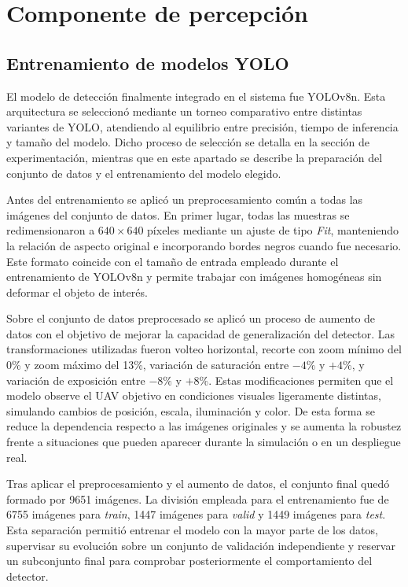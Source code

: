 \section{Componente de percepción}

\subsection{Entrenamiento de modelos YOLO}

El modelo de detección finalmente integrado en el sistema fue YOLOv8n. Esta arquitectura se seleccionó mediante un torneo comparativo entre distintas variantes de YOLO, atendiendo al equilibrio entre precisión, tiempo de inferencia y tamaño del modelo. Dicho proceso de selección se detalla en la sección de experimentación, mientras que en este apartado se describe la preparación del conjunto de datos y el entrenamiento del modelo elegido.

\vspace{0.3cm}

Antes del entrenamiento se aplicó un preprocesamiento común a todas las imágenes del conjunto de datos. En primer lugar, todas las muestras se redimensionaron a $640 \times 640$ píxeles mediante un ajuste de tipo \textit{Fit}, manteniendo la relación de aspecto original e incorporando bordes negros cuando fue necesario. Este formato coincide con el tamaño de entrada empleado durante el entrenamiento de YOLOv8n y permite trabajar con imágenes homogéneas sin deformar el objeto de interés.

\vspace{0.3cm}

Sobre el conjunto de datos preprocesado se aplicó un proceso de aumento de datos con el objetivo de mejorar la capacidad de generalización del detector. Las transformaciones utilizadas fueron volteo horizontal, recorte con zoom mínimo del 0\% y zoom máximo del 13\%, variación de saturación entre $-4\%$ y $+4\%$, y variación de exposición entre $-8\%$ y $+8\%$. Estas modificaciones permiten que el modelo observe el UAV objetivo en condiciones visuales ligeramente distintas, simulando cambios de posición, escala, iluminación y color. De esta forma se reduce la dependencia respecto a las imágenes originales y se aumenta la robustez frente a situaciones que pueden aparecer durante la simulación o en un despliegue real.

\vspace{0.3cm}

Tras aplicar el preprocesamiento y el aumento de datos, el conjunto final quedó formado por 9651 imágenes. La división empleada para el entrenamiento fue de 6755 imágenes para \textit{train}, 1447 imágenes para \textit{valid} y 1449 imágenes para \textit{test}. Esta separación permitió entrenar el modelo con la mayor parte de los datos, supervisar su evolución sobre un conjunto de validación independiente y reservar un subconjunto final para comprobar posteriormente el comportamiento del detector.

